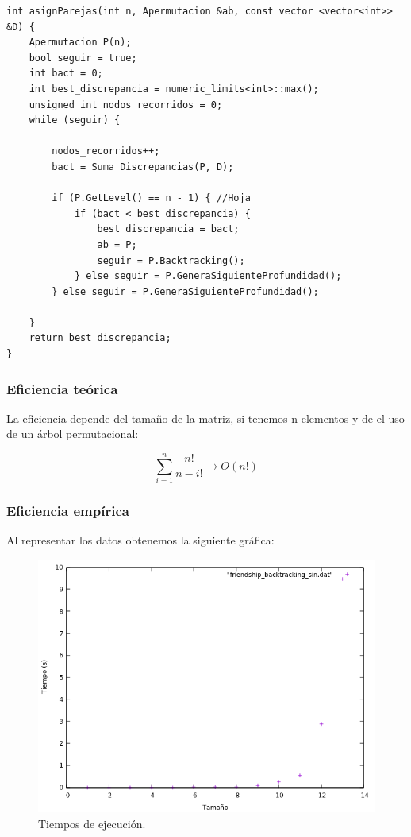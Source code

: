\begin{lstlisting}
int asignParejas(int n, Apermutacion &ab, const vector <vector<int>> &D) {
    Apermutacion P(n);
    bool seguir = true;
    int bact = 0;
    int best_discrepancia = numeric_limits<int>::max();
    unsigned int nodos_recorridos = 0;
    while (seguir) {

        nodos_recorridos++;
        bact = Suma_Discrepancias(P, D);

        if (P.GetLevel() == n - 1) { //Hoja
            if (bact < best_discrepancia) {
                best_discrepancia = bact;
                ab = P;
                seguir = P.Backtracking();
            } else seguir = P.GeneraSiguienteProfundidad();
        } else seguir = P.GeneraSiguienteProfundidad();

    }
    return best_discrepancia;
}
\end{lstlisting}


\subsubsection{Eficiencia teórica}

La eficiencia depende del tamaño de la matriz, si tenemos n elementos y de el uso de un árbol permutacional:

  \begin{equation}
      \sum_{i=1}^{n} \dfrac{n!}{n - i!} \rightarrow O(n!)
  \end{equation}

\subsubsection{Eficiencia empírica}

Al representar los datos obtenemos la siguiente gráfica:

\begin{figure}[H]
    \begin{center}
        \includegraphics[scale=0.7]{imagenes/bts.png}
        \caption{Tiempos de ejecución.}
        \label{fig19}
    \end{center}
\end{figure}

